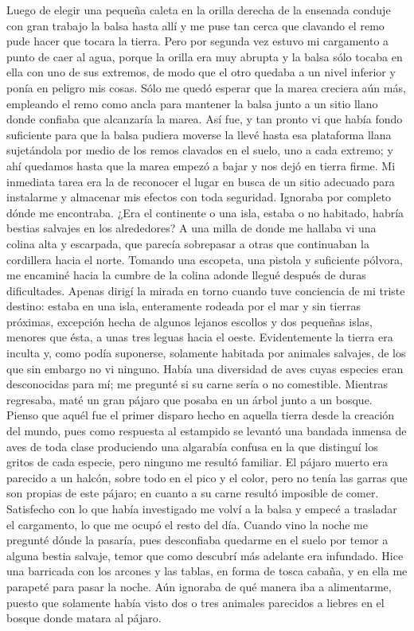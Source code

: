 \documentclass{novela}
\begin{document}
    Luego de elegir una pequeña caleta en la orilla derecha de la ensenada conduje con gran trabajo la balsa hasta allí y me puse tan cerca que clavando el remo pude hacer que tocara la tierra. Pero por segunda vez estuvo mi cargamento a punto de caer al agua, porque la orilla era muy abrupta y la balsa sólo tocaba en ella con uno de sus extremos, de modo que el otro quedaba a un nivel inferior y ponía en peligro mis cosas. Sólo me quedó esperar que la marea creciera aún más, empleando el remo como ancla para mantener la balsa junto a un sitio llano donde confiaba que alcanzaría la marea. Así fue, y tan pronto vi que había fondo suficiente para que la balsa pudiera moverse la llevé hasta esa plataforma llana sujetándola por medio de los remos clavados en el suelo, uno a cada extremo; y ahí quedamos hasta que la marea empezó a bajar y nos dejó en tierra firme.
    Mi inmediata tarea era la de reconocer el lugar en busca de un sitio adecuado para instalarme y almacenar mis efectos con toda seguridad. Ignoraba por completo dónde me encontraba. ¿Era el continente o una isla, estaba o no habitado, habría bestias salvajes en los alrededores? A una milla de donde me hallaba vi una colina alta y escarpada, que parecía sobrepasar a otras que continuaban la cordillera hacia el norte. Tomando una escopeta, una pistola y suficiente pólvora, me encaminé hacia la cumbre de la colina adonde llegué después de duras dificultades. Apenas dirigí la mirada en torno cuando tuve conciencia de mi triste destino: estaba en una isla, enteramente rodeada por el mar y sin tierras próximas, excepción hecha de algunos lejanos escollos y dos pequeñas islas, menores que ésta, a unas tres leguas hacia el oeste.
    Evidentemente la tierra era inculta y, como podía suponerse, solamente habitada por animales salvajes, de los que sin embargo no vi ninguno. Había una diversidad de aves cuyas especies eran desconocidas para mí; me pregunté si su carne sería o no comestible. Mientras regresaba, maté un gran pájaro que posaba en un árbol junto a un bosque. Pienso que aquél fue el primer disparo hecho en aquella tierra desde la creación del mundo, pues como respuesta al estampido se levantó una bandada inmensa de aves de toda clase produciendo una algarabía confusa en la que distinguí los gritos de cada especie, pero ninguno me resultó familiar. El pájaro muerto era parecido a un halcón, sobre todo en el pico y el color, pero no tenía las garras que son propias de este pájaro; en cuanto a su carne resultó imposible de comer.
    Satisfecho con lo que había investigado me volví a la balsa y empecé a trasladar el cargamento, lo que me ocupó el resto del día. Cuando vino la noche me pregunté dónde la pasaría, pues desconfiaba quedarme en el suelo por temor a alguna bestia salvaje, temor que como descubrí más adelante era infundado. Hice una barricada con los arcones y las tablas, en forma de tosca cabaña, y en ella me parapeté para pasar la noche. Aún ignoraba de qué manera iba a alimentarme, puesto que solamente había visto dos o tres animales parecidos a liebres en el bosque donde matara al pájaro.
\end{document}
